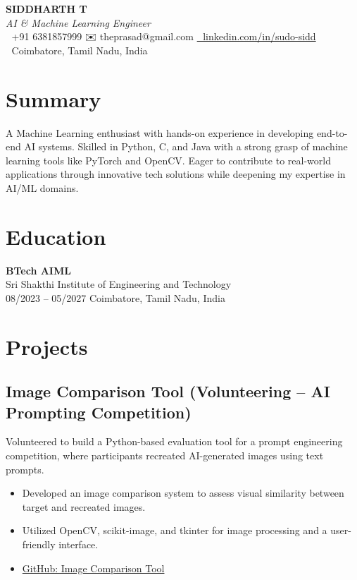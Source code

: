 \documentclass[11pt,a4paper]{article}
\begin{document}
\begin{center}
    {\LARGE \textbf{SIDDHARTH T}}\\
    \vspace{4pt}
    \textit{AI \& Machine Learning Engineer} \\
    \vspace{4pt}
    📱 +91 6381857999 \quad ✉️ theprasad@gmail.com \quad
    \href{https://www.linkedin.com/in/sudo-sidd/}{🔗 linkedin.com/in/sudo-sidd} \\
    📍 Coimbatore, Tamil Nadu, India
\end{center}

\vspace{10pt}

\section*{Summary}
A Machine Learning enthusiast with hands-on experience in developing end-to-end AI systems. Skilled in Python, C, and Java with a strong grasp of machine learning tools like PyTorch and OpenCV. Eager to contribute to real-world applications through innovative tech solutions while deepening my expertise in AI/ML domains.

\section*{Education}
\textbf{BTech AIML} \\
Sri Shakthi Institute of Engineering and Technology \\
08/2023 – 05/2027 \quad Coimbatore, Tamil Nadu, India

\section*{Projects}

\subsection*{Image Comparison Tool (Volunteering – AI Prompting Competition)}
Volunteered to build a Python-based evaluation tool for a prompt engineering competition, where participants recreated AI-generated images using text prompts.
\begin{itemize}[noitemsep]
  \item Developed an image comparison system to assess visual similarity between target and recreated images.
  \item Utilized OpenCV, scikit-image, and tkinter for image processing and a user-friendly interface.
  \item \href{https://github.com/sudo-sidd/Image_comparison_application}{GitHub: Image Comparison Tool}
\end{itemize}
\end{document}
